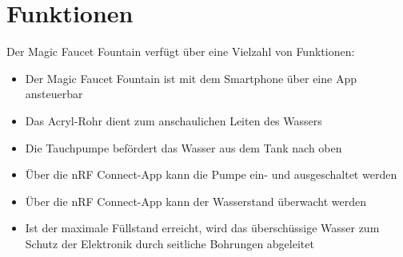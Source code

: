 %
%
%

\chapter{Funktionen}
Der Magic Faucet Fountain verfügt über eine Vielzahl von Funktionen:
\begin{itemize}
	\item Der Magic Faucet Fountain ist mit dem Smartphone über eine App ansteuerbar
	\item Das Acryl-Rohr dient zum anschaulichen Leiten des Wassers
	\item Die Tauchpumpe befördert das Wasser aus dem Tank nach oben
	\item Über die nRF Connect-App kann die Pumpe ein- und ausgeschaltet werden 
	\item Über die nRF Connect-App kann der Wasserstand überwacht werden 
	\item Ist der maximale Füllstand erreicht, wird das überschüssige Wasser zum Schutz der Elektronik durch seitliche Bohrungen abgeleitet
\end{itemize}

